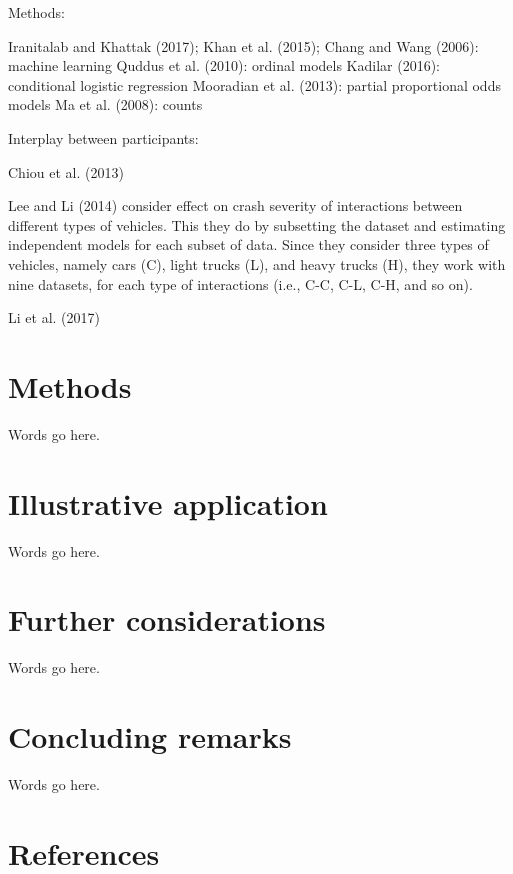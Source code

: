 \documentclass[]{elsarticle} %
\begin{document}
Methods:

Iranitalab and Khattak (2017); Khan et al. (2015); Chang and Wang
(2006): machine learning Quddus et al. (2010): ordinal models Kadilar
(2016): conditional logistic regression Mooradian et al. (2013): partial
proportional odds models Ma et al. (2008): counts

Interplay between participants:

Chiou et al. (2013)

Lee and Li (2014) consider effect on crash severity of interactions
between different types of vehicles. This they do by subsetting the
dataset and estimating independent models for each subset of data. Since
they consider three types of vehicles, namely cars (C), light trucks
(L), and heavy trucks (H), they work with nine datasets, for each type
of interactions (i.e., C-C, C-L, C-H, and so on).

Li et al. (2017)

\hypertarget{methods}{%
\section{Methods}\label{methods}}

Words go here.

\hypertarget{illustrative-application}{%
\section{Illustrative application}\label{illustrative-application}}

Words go here.

\hypertarget{further-considerations}{%
\section{Further considerations}\label{further-considerations}}

Words go here.

\hypertarget{concluding-remarks}{%
\section{Concluding remarks}\label{concluding-remarks}}

Words go here.

\hypertarget{references}{%
\section*{References}\label{references}}
\end{document}
